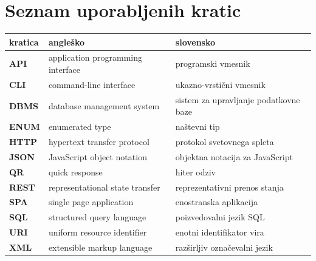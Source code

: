 \documentclass[a4paper, 12pt]{book}
\begin{document}
\chapter*{Seznam uporabljenih kratic}  %

\noindent\begin{tabular}{p{}|p{}|p{}}    %
  {\bf kratica} & {\bf angleško}                             & {\bf slovensko} \\ \hline
  {\bf API}   &  application programming interface              & programski vmesnik\\
  {\bf CLI}   & command-line interface              & ukazno-vrstični vmesnik \\
  {\bf DBMS}   &  database management system              & sistem za upravljanje podatkovne baze \\
  {\bf ENUM}   & enumerated type              & naštevni tip \\
  {\bf HTTP}   &  hypertext transfer protocol               &  protokol svetovnega spleta \\
  {\bf JSON}   &  JavaScript object notation               &  objektna notacija za JavaScript \\
  {\bf QR}   &  quick response              & hiter odziv\\
  {\bf REST}   & representational state transfer              & reprezentativni prenos stanja \\
  {\bf SPA}      & single page application               &  enostranska aplikacija \\	
  {\bf SQL} & structured query language & poizvedovalni jezik SQL  \\
  {\bf URI}   &  uniform resource identifier              & enotni identifikator vira \\
  {\bf XML}   &  extensible markup language              & razširljiv označevalni jezik \\

\end{tabular}
\end{document}
